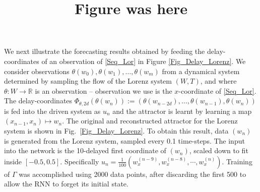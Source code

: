 \documentclass[12 pt]{article}
\begin{document}
We next illustrate the forecasting results obtained by feeding the delay-coordinates of an observation  of \eqref{Seq_Lor} in Figure \ref{Fig_Delay_Lorenz}.
We consider observations $\theta(w_{0}),\theta(w_{1}),\ldots,\theta(w_{m})$ from a  dynamical system determined  by sampling the flow of the Lorenz system $(W,T)$, and where $\theta:W \to \mathbb{R}$ is an observation -- observation we use is the $x$-coordinate of \eqref{Seq_Lor}. The delay-coordinates $\Phi_{\theta,2d}(\theta(w_{n})) := (\theta(w_{n-2d}),\ldots,\theta(w_{n-1}),\theta(w_{n}))$ is fed into the driven system as $u_n$ and the attractor is learnt by learning a map $(x_{n-1},x_{n}) \mapsto w_n$. The original and reconstructed attractor for the Lorenz system is shown in Fig.~\ref{Fig_Delay_Lorenz}. To obtain this result, data $(w_n)$ is generated from the Lorenz system, sampled every 0.1 time-steps. The input into the network is the 10-delayed first coordinate of $(w_n)$, scaled down to fit inside $[-0.5,0.5]$. Specifically $u_n = \frac{1}{100}  (w^{(n-9)}_x,w^{(n-8)}_x,\cdots ,w^{(n)}_x )$. Training of $\Gamma$ was accomplished using 2000 data points, after discarding the first 500 to allow the RNN to forget its initial state. 

\title{Figure was here}
\end{document}
